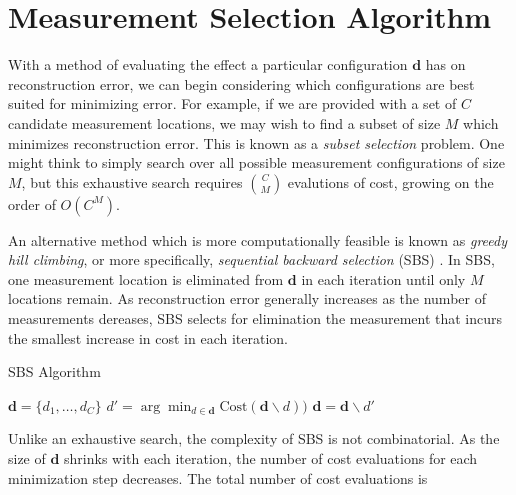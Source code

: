 \documentclass{article}
\begin{document}
\section{Measurement Selection Algorithm}

With a method of evaluating the effect a particular configuration $\bm{d}$ has
on reconstruction error, we can begin considering which configurations are best
suited for minimizing error.  For example, if we are provided with a set of $C$
candidate measurement locations, we may wish to find a subset of size $M$ which
minimizes reconstruction error. This is known as a \emph{subset selection} problem.
One might think to simply  search over all possible measurement configurations
of size $M$, but this exhaustive search requires $\binom{C}{M}$ evalutions of
cost, growing on the order of $O(C^M)$.

An alternative method which is more computationally feasible is known as
\emph{greedy hill climbing}, or more specifically, \emph{sequential backward
selection} (SBS) \cite{sharif}. In SBS, one measurement location is eliminated from $\bm{d}$ in each
iteration until only $M$ locations remain. As reconstruction error generally
increases as the number of measurements dereases, SBS selects for elimination the
measurement that incurs the smallest increase in cost in each iteration.

\begin{algorithm}
  \begin{algorithmic}
    \caption{SBS Algorithm}
    \State $\bm{d} = \{d_1, \dots, d_C\}$
    \Repeat
      \State $d' = \arg \min_{d \in \bm{d}} \text{Cost}(\bm{d} \backslash d))$
      \State $\bm{d} = \bm{d} \backslash d'$
  \end{algorithmic}
\end{algorithm}

Unlike an exhaustive search, the complexity of SBS is not combinatorial.  As the
size of $\bm{d}$ shrinks with each iteration, the number of cost evaluations for each
minimization step decreases.  The total number of cost evaluations is
\end{document}
